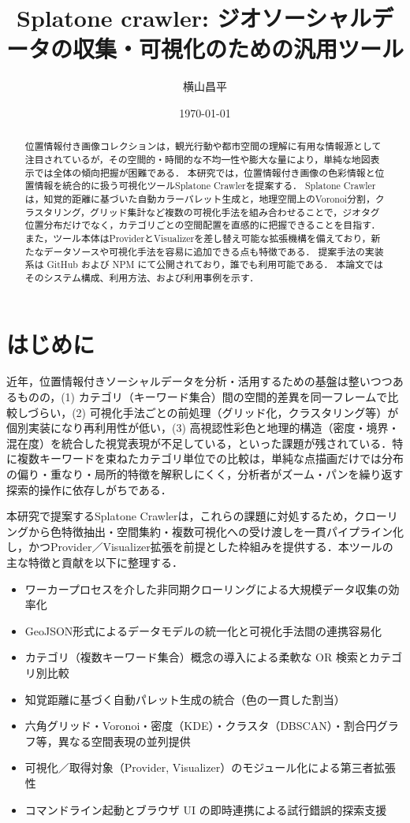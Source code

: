 \documentclass[11pt,a4paper]{jlreq}
\title{Splatone crawler: ジオソーシャルデータの収集・可視化のための汎用ツール}
\author[1]{横山昌平}
\affil[1]{東京都立大学, 東京都日野市旭が丘6-6}
\date{\today}
\begin{document}
\maketitle

\begin{abstract}
  位置情報付き画像コレクションは，観光行動や都市空間の理解に有用な情報源として注目されているが，その空間的・時間的な不均一性や膨大な量により，単純な地図表示では全体の傾向把握が困難である．
  本研究では，位置情報付き画像の色彩情報と位置情報を統合的に扱う可視化ツールSplatone Crawlerを提案する．
  Splatone Crawlerは，知覚的距離に基づいた自動カラーパレット生成と，地理空間上のVoronoi分割，クラスタリング，グリッド集計など複数の可視化手法を組み合わせることで，ジオタグ位置分布だけでなく，カテゴリごとの空間配置を直感的に把握できることを目指す．
  また，ツール本体はProviderとVisualizerを差し替え可能な拡張機構を備えており，新たなデータソースや可視化手法を容易に追加できる点も特徴である．
  提案手法の実装系は GitHub および NPM にて公開されており，誰でも利用可能である．
  本論文ではそのシステム構成、利用方法、および利用事例を示す．
\end{abstract}

\section{はじめに}
近年，位置情報付きソーシャルデータを分析・活用するための基盤は整いつつあるものの，(1) カテゴリ（キーワード集合）間の空間的差異を同一フレームで比較しづらい，(2) 可視化手法ごとの前処理（グリッド化，クラスタリング等）が個別実装になり再利用性が低い，(3) 高視認性彩色と地理的構造（密度・境界・混在度）を統合した視覚表現が不足している，といった課題が残されている．特に複数キーワードを束ねたカテゴリ単位での比較は，単純な点描画だけでは分布の偏り・重なり・局所的特徴を解釈しにくく，分析者がズーム・パンを繰り返す探索的操作に依存しがちである．


本研究で提案するSplatone Crawlerは，これらの課題に対処するため，クローリングから色特徴抽出・空間集約・複数可視化への受け渡しを一貫パイプライン化し，かつProvider／Visualizer拡張を前提とした枠組みを提供する．本ツールの主な特徴と貢献を以下に整理する．
\begin{itemize}
  \item ワーカープロセスを介した非同期クローリングによる大規模データ収集の効率化
  \item GeoJSON形式によるデータモデルの統一化と可視化手法間の連携容易化
  \item カテゴリ（複数キーワード集合）概念の導入による柔軟な OR 検索とカテゴリ別比較
  \item 知覚距離に基づく自動パレット生成の統合（色の一貫した割当）
  \item 六角グリッド・Voronoi・密度（KDE）・クラスタ（DBSCAN）・割合円グラフ等，異なる空間表現の並列提供
  \item 可視化／取得対象（Provider, Visualizer）のモジュール化による第三者拡張性
  \item コマンドライン起動とブラウザ UI の即時連携による試行錯誤的探索支援
\end{itemize}
\end{document}
